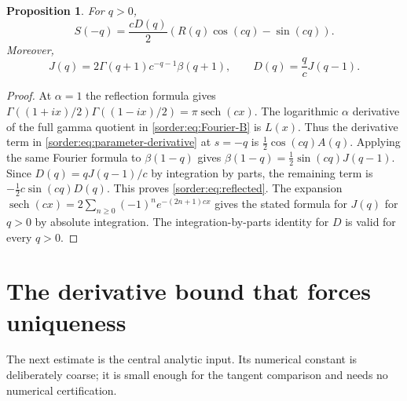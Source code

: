 \documentclass[11pt,a4paper]{article}
\newtheorem{proposition}[theorem]{Proposition}
\theoremstyle{definition}
\theoremstyle{remark}
\newcommand{\sech}{\operatorname{sech}}
\numberwithin{equation}{section}
\begin{document}
\begin{proposition}\label{sorder:prop:reflected}
For $q>0$,
\begin{equation}\label{sorder:eq:reflected}
 S(-q)=\frac{cD(q)}2
       \left(R(q)\cos(cq)-\sin(cq)\right).
\end{equation}
Moreover,
\begin{equation}\label{sorder:eq:moments}
 J(q)=2\Gamma(q+1)c^{-q-1}\beta(q+1),\qquad
 D(q)=\frac q c J(q-1).
\end{equation}
\end{proposition}
\begin{proof}
At $\alpha=1$ the reflection formula gives
$\Gamma((1+ix)/2)\Gamma((1-ix)/2)=\pi\sech(cx)$.
The logarithmic $\alpha$ derivative of the full gamma quotient in
\eqref{sorder:eq:Fourier-B} is $L(x)$.
Thus the derivative term in \eqref{sorder:eq:parameter-derivative}
at $s=-q$ is $\tfrac12\cos(cq)A(q)$.
Applying the same Fourier formula to $\beta(1-q)$ gives
$\beta(1-q)=\tfrac12\sin(cq)J(q-1)$.
Since $D(q)=qJ(q-1)/c$ by integration by parts, the remaining term is
$-\tfrac12 c\sin(cq)D(q)$. This proves \eqref{sorder:eq:reflected}.
The expansion $\sech(cx)=2\sum_{n\ge0}(-1)^ne^{-(2n+1)cx}$
gives the stated formula for $J(q)$ for $q>0$ by absolute integration.
The integration-by-parts identity for $D$ is valid for every $q>0$.
\end{proof}

\section{The derivative bound that forces uniqueness}

The next estimate is the central analytic input. Its numerical constant
is deliberately coarse; it is small enough for the tangent comparison
and needs no numerical certification.
\end{document}
